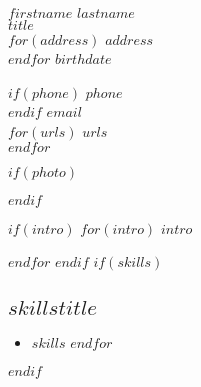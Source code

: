 \documentclass[$fontsize$, a4paper, oneside]{article}
\begin{document}
\begin{minipage}[t]{0.4\linewidth}

{\LARGE $firstname$ $lastname$}\\
\vspace{\baselineskip}
{\Large \MakeLowercase{\textsc{$title$}}}\\
\vspace{\baselineskip}
$for(address)$
$address$\\
$endfor$
\vspace{\baselineskip}
$birthdate$\\

\end{minipage}
\begin{minipage}[t]{0.4\linewidth}
\vspace{.63cm}

$if(phone)$
\href{tel:$phone$}{$phone$}\\
$endif$
\href{mailto:$email$}{$email$}\\
\vspace{\baselineskip}
$for(urls)$
\href{http://$urls$}{$urls$}\\
$endfor$

\end{minipage}
$if(photo)$
\begin{minipage}[t]{0.2\linewidth}
\vspace{-1.4cm}
\begin{flushright}
\end{flushright}

\end{minipage}
$endif$

$if(intro)$
\vspace{.915cm}
$for(intro)$
$intro$

\setlength\parindent{1em}
$endfor$
\setlength\parindent{0em}
$endif$
\vspace{4pt}
$if(skills)$
\subsection*{$skillstitle$}
\begin{itemize}
    \setlength\itemsep{-.25em}
    $for(skills)$
      \item $skills$
    $endfor$
\end{itemize}
$endif$
\end{document}
